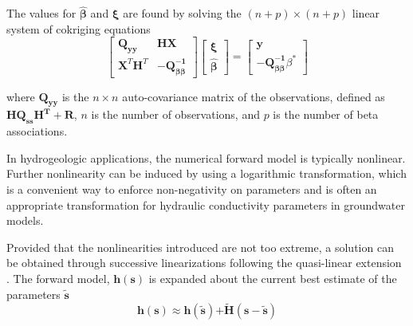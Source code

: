 \documentclass[11pt,oneside,onecolumn]{usgsreport}
\begin{document}
\begin{appendix}
The values for $\mathbf{\hat{\beta}}$ and $\mathbf{\xi}$ are found
by solving the $(n+p)\times(n+p)$ linear system of cokriging equations
\begin{equation}
\left[\begin{array}{cc}
\mathbf{Q_{yy}} & \mathbf{HX}\\
\mathbf{X}^{T}\mathbf{H}^{T} & \mathbf{-}\mathbf{Q_{\beta\beta}^{-1}}
\end{array}\right]\left[\begin{array}{c}
\mathbf{\xi}\\
\mathbf{\hat{\beta}}
\end{array}\right]=\left[\begin{array}{c}
\mathbf{y}\\
\mathbf{-}\mathbf{Q_{\beta\beta}^{-1}}\beta^{*}
\end{array}\right]\label{eq:cokriging-1}
\end{equation}


where $\mathbf{Q_{yy}}$ is the $n\times n$ auto-covariance matrix
of the observations, defined as $\mathbf{HQ_{ss}H^{\mathbf{T}}+R}$,
$n$ is the number of observations, and $p$ is the number of beta
associations.

In hydrogeologic applications, the numerical forward model is typically
nonlinear. Further nonlinearity can be induced by using a logarithmic
transformation, which is a convenient way to enforce non-negativity
on parameters and is often an appropriate transformation for hydraulic
conductivity parameters in groundwater models.

Provided that the nonlinearities introduced are not too extreme, a
solution can be obtained through successive linearizations following
the quasi-linear extension \citep{Kitanidis1995}. The forward model,
$\mathbf{h(s)}$ is expanded about the current best estimate of the
parameters $\mathbf{\tilde{s}}$
\[
\mathbf{h}(\mathbf{s})\mathbf{\approx h}(\mathbf{\tilde{s}})\mathbf{+\tilde{H}}(\mathbf{s-\tilde{s}})
\]



\end{appendix}
\end{document}
